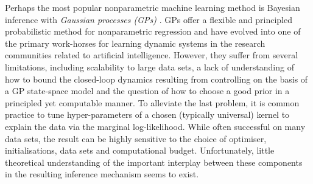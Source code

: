 Perhaps the most popular nonparametric machine learning method is Bayesian inference with \textit{Gaussian processes (GPs)} \cite{GPbook:2006}. GPs offer a flexible and principled probabilistic method for nonparametric regression and have evolved into one of the primary work-horses for learning dynamic systems \cite{Deisenroth2009,Deisenroth2011,Deisenroth2015,Tuongmodellearningsurvey2011,deisenrothsurvey2013,McHutchonthesis2014} in the research communities related to artificial intelligence. 
However, they suffer from several limitations, including scalability to large data sets, a lack of understanding of how to bound the closed-loop dynamics resulting from controlling on the basis of a GP state-space model and the question of how to choose a good prior in a principled yet computable manner. To alleviate the last problem, it is common practice to tune hyper-parameters of a chosen (typically universal) kernel to explain the data via the marginal log-likelihood. While often successful on many data sets, the result can be highly sensitive to the choice of optimiser, initialisations, data sets and computational budget. Unfortunately, little theoretical understanding of the important interplay between these components in the resulting inference mechanism seems to exist.
%
